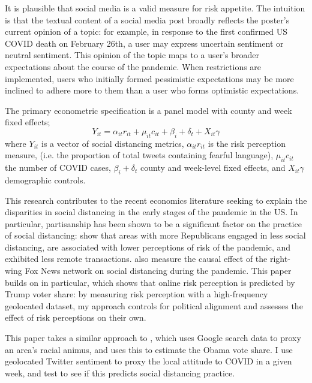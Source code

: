 \documentclass{article}
\begin{document}
It is plausible that social media is a valid measure for risk appetite. The intuition is that the textual content of a social media post broadly reflects the poster's current opinion of a topic: for example, in response to the first confirmed US COVID death on February 26th, a user may express uncertain sentiment or neutral sentiment. This opinion of the topic maps to a user's broader expectations about the course of the pandemic. When restrictions are implemented, users who initially formed pessimistic expectations may be more inclined to adhere more to them than a user who forms optimistic expectations. 

The primary econometric specification is a panel model with county and week fixed effects;
\[Y_{it} = \alpha_{it} r_{it} + \mu_{it} c_{it} + \beta_i + \delta_t +  X_{it}\gamma \]
where \(Y_{it}\) is a vector of social distancing metrics, \(\alpha_{it} r_{it}\) is the risk perception measure, (i.e. the proportion of total tweets containing fearful language), \(\mu_{it} c_{it}\) the number of COVID cases, \(\beta_i + \delta_t\) county and week-level fixed effects, and \(X_{it}\gamma\) demographic controls. 

This research contributes to the recent economics literature seeking to explain the disparities in social distancing in the early stages of the pandemic in the US. In particular, partisanship has been shown to be a significant factor on the practice of social distancing: \textcite{allcottPolarizationPublicHealth2020,barriosRiskPerceptionLens2020,painterPoliticalBeliefsAffect2020} show that areas with more Republicans engaged in less social distancing, are associated with lower perceptions of risk of the pandemic, and exhibited less remote transactions. \textcite{simonovPersuasiveEffectFox2020,ananyevSafestTimeFly2020} also measure the causal effect of the right-wing Fox News network on social distancing during the pandemic. This paper builds on \textcite{barriosRiskPerceptionLens2020} in particular, which shows that online risk perception is predicted by Trump voter share: by measuring risk perception with a high-frequency geolocated dataset, my approach controls for political alignment and assesses the effect of risk perceptions on their own.

This paper takes a similar approach to \textcite{stephens-davidowitzCostRacialAnimus2014}, which uses Google search data to proxy an area's racial animus, and uses this to estimate the Obama vote share. I use geolocated Twitter sentiment to proxy the local attitude to COVID in a given week, and test to see if this predicts social distancing practice. 
\end{document}
